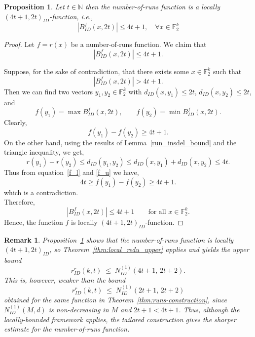 \documentclass[11 pt]{article}
\numberwithin{equation}{section}
\newtheorem{proposition}[theorem]{Proposition}
\newtheorem{remark}[theorem]{Remark}
\begin{document}
    \begin{proposition}
    \label{prop:runs-local}
        Let $t \in \mathbb{N}$ then the number-of-runs function is a locally $(4t+1, 2t)_{ID}$-function, i.e., $$|B^f_{ID}(x,2t)| \leq 4t + 1, \quad \forall x \in \mathbb{F}_2^k$$
    \end{proposition}
    \begin{proof}
        Let $f = r(x)$ be a number-of-runs function.  
        We claim that
        \[
             |B^f_{ID}(x,2t)| \leq 4t + 1.
        \]
        
        Suppose, for the sake of contradiction, that there exists some $x \in \mathbb{F}_2^k$ such that  
        \[
            |B_{ID}^f(x,2t)| > 4t + 1.
        \]
        Then we can find two vectors $y_1, y_2 \in \mathbb{F}_2^k$ with  
        $d_{ID}(x,y_1) \le 2t$, $d_{ID}(x,y_2) \le 2t$, and 
        \[
            f(y_1) = \max B_{ID}^f(x,2t), \qquad 
            f(y_2) = \min B_{ID}^f(x,2t).
        \]
        Clearly,
        \begin{equation}\label{f_l}
            f(y_1) - f(y_2) \ge  4t + 1.
        \end{equation}
        On the other hand, using the results of Lemma~\ref{run_insdel_bound} and the triangle inequality, we get,
        \begin{equation}\label{f_u}
            {r}(y_1) - r(y_2) 
           \le d_{ID}(y_1,y_2) 
           \le d_{ID}(x,y_1) + d_{ID}(x,y_2) 
           \le 4t.
        \end{equation}
        Thus from equation~\eqref{f_l} and \eqref{f_u} we have,
        \[
            4t \ge f(y_1) - f(y_2) \ge  4t + 1.
        \]
        which is a contradiction.  \\        
        Therefore, 
        \[
            |B_{ID}^f(x,2t)| \le 4t + 1
            \qquad \text{for all } x \in \mathbb{F}_2^k.
        \]
        Hence, the function $f$ is locally $(4t+1, 2t)_{ID}$-function.
    \end{proof}

   \begin{remark}
    \label{rmk:runs-local-vs-tailored}
    Proposition~\ref{prop:runs-local} shows that the number-of-runs function is locally $(4t+1, 2t)_{ID}$, so Theorem~\ref{thm:local_redu_upper} applies and yields the upper bound
    \[
    r^{r}_{ID}(k,t) \;\le\; N^{(1)}_{ID}(4t+1,\, 2t+2).
    \]
    This is, however, weaker than the bound
    \[
    r^{r}_{ID}(k,t) \;\le\; N^{(1)}_{ID}(2t+1,\, 2t+2)
    \]
    obtained for the same function in Theorem~\ref{thm:runs-construction}, since $N^{(1)}_{ID}(M,d)$ is non-decreasing in $M$ and $2t+1 < 4t+1$. Thus, although the locally-bounded framework applies, the tailored construction gives the sharper estimate for the number-of-runs function.
    \end{remark} 
    
\end{document}
